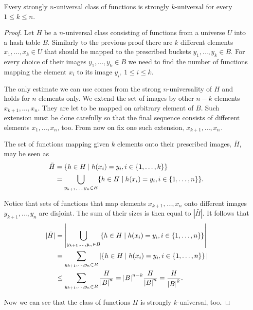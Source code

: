 \begin{theorem}
\label{remark-n-to-k}
Every strongly $n$-universal class of functions is strongly $k$-universal for every $1 \leq k \leq n$.
\end{theorem}
\begin{proof}
Let $H$ be a $n$-universal class consisting of functions from a universe $U$ into a hash table $B$. Similarly to the previous proof there are $k$ different elements $x_1, \dots, x_k \in U$ that should be mapped to the prescribed buckets $y_1, \dots, y_k \in B$. For every choice of their images $y_1, \dots, y_k \in B$ we need to find the number of functions mapping the element $x_i$ to its image $y_i$, $1 \leq i \leq k$. 

The only estimate we can use comes from the strong $n$-universality of $H$ and holds for $n$ elements only. We extend the set of images by other $n - k$ elements $x_{k + 1}, \dots, x_n$. They are let to be mapped on arbitrary element of $B$. Such extension must be done carefully so that the final sequence consists of different elements $x_1, \dots, x_n$, too. From now on fix one such extension, $x_{k + 1}, \dots, x_n$.

The set of functions mapping given $k$ elements onto their prescribed images, $\bar H$, may be seen as
\[
\begin{split}
\bar{H}	& = \lbrace h \in H \mid h(x_i) = y_i, i \in \lbrace 1, \dots, k \rbrace \rbrace \\
	& = \displaystyle \bigcup_{y_{k+1}, \dots, y_n \in B} \lbrace h \in H \mid h(x_i) = y_i, i \in \lbrace 1, \dots, n \rbrace \rbrace \text{.}
\end{split}
\]

Notice that sets of functions that map elements $x_{k + 1}, \dots, x_n$ onto different images $y_{k + 1}, \dots, y_n$ are disjoint. The sum of their sizes is then equal to $|\bar H|$. It follows that
\[
\begin{split}
|\bar H|& = \left| \displaystyle \bigcup_{y_{k+1}, \dots, y_n \in B} \lbrace h \in H \mid h(x_i) = y_i, i \in \lbrace 1, \dots, n \rbrace \rbrace \right| \\
	& = \displaystyle \sum_{y_{k+1}, \dots, y_n \in B} \left| \lbrace h \in H \mid h(x_i) = y_i, i \in \lbrace 1, \dots, n \rbrace \rbrace \right| \\
	& \leq \displaystyle \sum_{y_{k+1}, \dots, y_n \in B} \frac{H}{{|B|}^{n}} = {|B|}^{n - k} \frac{H}{{|B|}^{n}} = \frac{H}{{|B|}^{k}} \text{.}
\end{split}
\]

Now we can see that the class of functions $H$ is strongly $k$-universal, too.
\end{proof}

